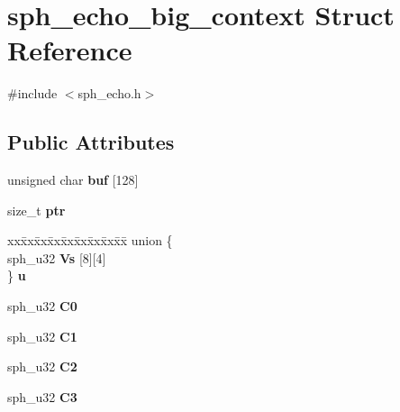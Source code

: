 \hypertarget{structsph__echo__big__context}{}\section{sph\+\_\+echo\+\_\+big\+\_\+context Struct Reference}
\label{structsph__echo__big__context}


{\ttfamily \#include $<$sph\+\_\+echo.\+h$>$}

\subsection*{Public Attributes}
\begin{DoxyCompactItemize}
\item 
\mbox{\label{structsph__echo__big__context_afbbb9735887ec344ebbf08794fb2ab88}} 
unsigned char {\bfseries buf} \mbox{[}128\mbox{]}
\item 
\mbox{\label{structsph__echo__big__context_a6fdc1eb8dd708859a33005694d4f7bea}} 
size\+\_\+t {\bfseries ptr}
\item 
\mbox{\label{structsph__echo__big__context_af4ab8f7c32f6ad7ca52dfe339bc7abea}} 
\begin{tabbing}
xx\=xx\=xx\=xx\=xx\=xx\=xx\=xx\=xx\=\kill
union \{\\
\>sph\_u32 {\bfseries Vs} \mbox{[}8\mbox{]}\mbox{[}4\mbox{]}\\
\} {\bfseries u}\\

\end{tabbing}\item 
\mbox{\label{structsph__echo__big__context_a09f8372745d87b7dbd3539537c0ffbe6}} 
sph\+\_\+u32 {\bfseries C0}
\item 
\mbox{\label{structsph__echo__big__context_a67491384a26e2b2b255acbf5c0d31dea}} 
sph\+\_\+u32 {\bfseries C1}
\item 
\mbox{\label{structsph__echo__big__context_a23512c6f7c858b9fa14d266b230a0397}} 
sph\+\_\+u32 {\bfseries C2}
\item 
\mbox{\label{structsph__echo__big__context_ab35268b438f8a2aeb96a48ecbc055b81}} 
sph\+\_\+u32 {\bfseries C3}
\end{DoxyCompactItemize}


